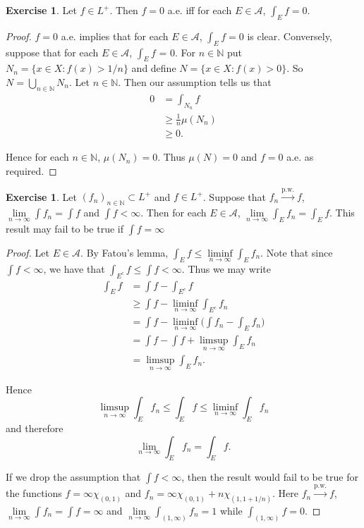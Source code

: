\documentclass[12pt]{amsart}
\theoremstyle{definition}
\newtheorem{ex}[definition]{Exercise}
\newcommand{\N}{\mathbb{N}}
\newcommand{\MA}{\mathcal{A}}
\newcommand{\limfn}{\liminf \limits_{n \rightarrow \infty}}
\newcommand{\limpn}{\limsup \limits_{n \rightarrow \infty}}
\newcommand{\limn}{\lim \limits_{n \rightarrow \infty}}
\begin{document}
	\begin{ex}
		Let $f \in L^+$. Then $f =0$ a.e. iff for each $E \in \MA$, $\int_E f =0$.
	\end{ex}
	
	\begin{proof}
		$f = 0$ a.e. implies that for each $E \in \MA$, $\int_E f =0$ is clear. Conversely, suppose that for each $E \in \MA$, $\int_E f$ = 0. For $n \in \N$ put $N_n = \{x \in X: f(x) > 1/n\}$ and define $N = \{x \in X: f(x)>0\}$. So $N = \bigcup\limits_{n \in \N} N_n$. Let $n \in \N$. Then our assumption tells us that 
		\begin{align*}
			0 
			&= \int_{N_n} f \\
			& \geq \frac{1}{n}\mu(N_n)\\
			& \geq 0.
		\end{align*} 
		
		Hence for each $n \in \N$, $\mu(N_n) = 0$. Thus $\mu(N) = 0$ and $f =0$ a.e. as required.
		
	\end{proof}
	
	\begin{ex}
		
		Let $(f_n)_{n \in \N} \subset L^+$ and $f \in L^+$. Suppose that $f_n \xrightarrow{\text{p.w.}} f$, $\lim \limits_{n \rightarrow \infty} \int f_n = \int f$ and $\int f < \infty$. Then for each $E \in \MA$, $\lim \limits_{n \rightarrow \infty} \int_E f_n = \int_E f$. This result may fail to be true if $\int f = \infty$
		
	\end{ex}
	
	\begin{proof}
		
		Let $E \in \MA$. By Fatou's lemma, $\int_E f \leq \limfn \int_E f_n$. Note that since $\int f < \infty$, we have that $\int_{E^c} f \leq \int f < \infty$. Thus we may write
		\begin{align*}
			\int_E f 
			&= \int f - \int_{E^c} f\\
			&\geq \int f - \limfn \int_{E^c} f_n\\
			&= \int f - \limfn \bigg(\int f_n - \int_{E} f_n\bigg)\\
			&= \int f - \int f  + \limpn \int_{E} f_n\\
			&= \limpn \int_E f_n.
		\end{align*}
		
		Hence $$\limpn \int_E f_n \leq \int_E f \leq \limfn \int_E f_n$$ and therefore $$\limn \int_E f_n = \int_E f.$$ 
		
		If we drop the assumption that $\int f < \infty$, then the result would fail to be true for the functions $f = \infty \chi_{(0,1)}$ and $ f_n = \infty \chi_{(0,1)} + n \chi_{(1,1+1/n)}$. Here $f_n \xrightarrow{\text{p.w.}} f$, $\limn \int f_n = \int f = \infty$ and $\limn \int_{(1,\infty)} f_n = 1$ while $\int_{(1,\infty)} f = 0$.  
		
	\end{proof}
	
\end{document}
